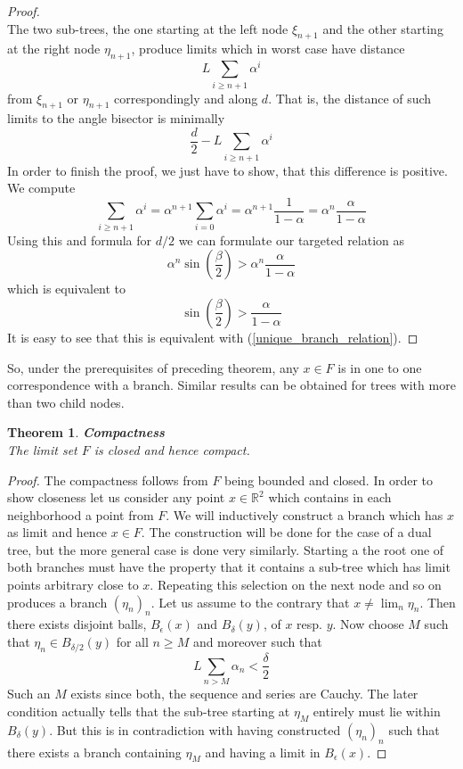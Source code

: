 \documentclass[17pt]{extarticle}
\newtheorem*{theorem*}{Theorem}
\begin{document}
\begin{proof}
$$	$$
	The two sub-trees, the one starting at the left node $\xi_{n+1}$ and the other starting at the right node $\eta_{n+1}$, produce limits which in worst case have distance 
	$$
	L\sum_{i\geq n+1}\alpha^i
	$$
	from  $\xi_{n+1}$ or $\eta_{n+1}$ correspondingly and along $d$. That is, the distance of such limits to the angle bisector is minimally 
	$$
	\frac{d}{2}-L\sum_{i\geq n+1}\alpha^i
	$$
	In order to finish the proof, we just have to show, that this difference is positive. We compute
	$$
	\sum_{i\geq n+1}\alpha^i=\alpha^{n+1}\sum_{i=0}\alpha^i=\alpha^{n+1}\frac{1}{1-\alpha}=
	\alpha^{n}\frac{\alpha}{1-\alpha}
	$$
	Using this and formula for $d/2$ we can formulate our targeted relation as
	$$
	\alpha^{n}\sin\left(\frac{\beta}{2}\right)>\alpha^n\frac{\alpha}{1-\alpha}
	$$
	which is equivalent to
	$$
	\sin\left(\frac{\beta}{2}\right)>\frac{\alpha}{1-\alpha}
	$$
	It is easy to see that this is equivalent with (\ref{unique_branch_relation}).	
\end{proof}
So, under the prerequisites of preceding theorem, any $x\in F$ is in one to one correspondence with a branch. Similar results can be obtained for trees with more than two child nodes.

\begin{theorem*}
	\textbf{Compactness}\\
	The limit set $F$ is closed and hence compact.
\end{theorem*}
\begin{proof}
	The compactness follows from $F$ being bounded and closed. In order to show closeness let us consider any point $x\in\mathbb{R}^2$ which contains in each neighborhood a point from $F$. We will inductively construct a branch which has $x$ as limit and hence $x\in F$. The construction will be done for the case of a dual tree, but the more general case is done very similarly. Starting a the root one of both branches must have the property that it contains a sub-tree which has limit points arbitrary close to $x$. Repeating this selection on the next node and so on produces a branch $(\eta_n)_n$. Let us assume to the contrary that $x\neq\lim_n\eta_n$. Then there exists disjoint balls, $B_{\epsilon}(x)$ and $B_{\delta}(y)$, of $x$ resp. $y$. Now choose $M$ such that $\eta_n\in B_{\delta/2}(y)$ for all $n\geq M$ and moreover such that
	$$
	L\sum_{n>M}\alpha_n < \frac{\delta}{2}
	$$
	Such an $M$ exists since both, the sequence and series are Cauchy. The later condition actually tells that the sub-tree starting at $\eta_{M}$ entirely must lie within $B_{\delta}(y)$. But this is in contradiction with having constructed $(\eta_n)_n$ such that there exists a branch containing $\eta_M$ and having a limit in $B_{\epsilon}(x)$.
\end{proof}
\end{document}
